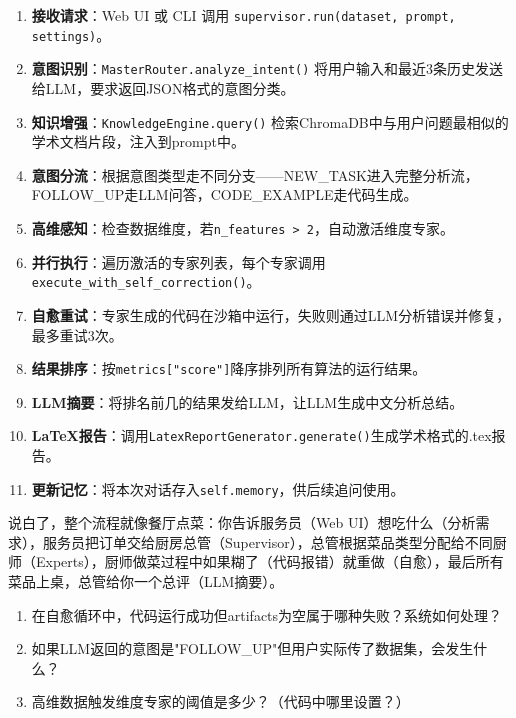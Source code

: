 \documentclass[11pt,a4paper]{ctexbook}
\begin{document}
\begin{enumerate}
    \item \textbf{接收请求}：Web UI 或 CLI 调用 \texttt{supervisor.run(dataset, prompt, settings)}。
    \item \textbf{意图识别}：\texttt{MasterRouter.analyze\_intent()} 将用户输入和最近3条历史发送给LLM，要求返回JSON格式的意图分类。
    \item \textbf{知识增强}：\texttt{KnowledgeEngine.query()} 检索ChromaDB中与用户问题最相似的学术文档片段，注入到prompt中。
    \item \textbf{意图分流}：根据意图类型走不同分支——NEW\_TASK进入完整分析流，FOLLOW\_UP走LLM问答，CODE\_EXAMPLE走代码生成。
    \item \textbf{高维感知}：检查数据维度，若\verb|n_features > 2|，自动激活维度专家。
    \item \textbf{并行执行}：遍历激活的专家列表，每个专家调用\verb|execute_with_self_correction()|。
    \item \textbf{自愈重试}：专家生成的代码在沙箱中运行，失败则通过LLM分析错误并修复，最多重试3次。
    \item \textbf{结果排序}：按\verb|metrics["score"]|降序排列所有算法的运行结果。
    \item \textbf{LLM摘要}：将排名前几的结果发给LLM，让LLM生成中文分析总结。
    \item \textbf{LaTeX报告}：调用\verb|LatexReportGenerator.generate()|生成学术格式的.tex报告。
    \item \textbf{更新记忆}：将本次对话存入\verb|self.memory|，供后续追问使用。
\end{enumerate}

\begin{plainbox}
    说白了，整个流程就像餐厅点菜：你告诉服务员（Web UI）想吃什么（分析需求），服务员把订单交给厨房总管（Supervisor），总管根据菜品类型分配给不同厨师（Experts），厨师做菜过程中如果糊了（代码报错）就重做（自愈），最后所有菜品上桌，总管给你一个总评（LLM摘要）。
\end{plainbox}

\begin{reviewbox}
    \begin{enumerate}
        \item 在自愈循环中，代码运行成功但artifacts为空属于哪种失败？系统如何处理？
        \item 如果LLM返回的意图是"FOLLOW\_UP"但用户实际传了数据集，会发生什么？
        \item 高维数据触发维度专家的阈值是多少？（代码中哪里设置？）
    \end{enumerate}
\end{reviewbox}
\end{document}

